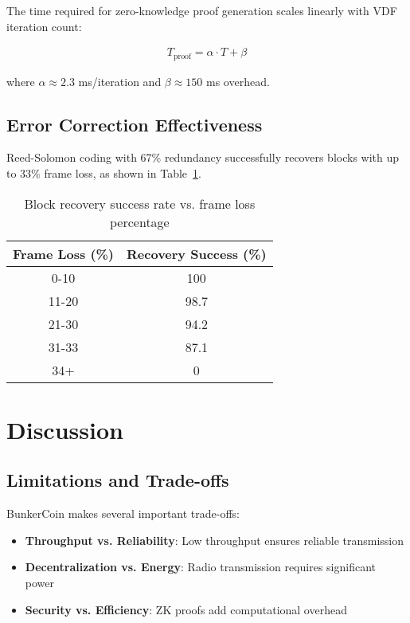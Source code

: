 \documentclass[11pt,a4paper]{article}
\begin{document}
The time required for zero-knowledge proof generation scales linearly with VDF iteration count:

\begin{align}
T_{\text{proof}} = \alpha \cdot T + \beta
\end{align}

where $\alpha \approx 2.3$ ms/iteration and $\beta \approx 150$ ms overhead.

\subsection{Error Correction Effectiveness}

Reed-Solomon coding with 67\% redundancy successfully recovers blocks with up to 33\% frame loss, as shown in Table~\ref{tab:error_correction}.

\begin{table}[h]
\centering
\caption{Block recovery success rate vs. frame loss percentage}
\label{tab:error_correction}
\begin{tabular}{@{}cc@{}}
\toprule
Frame Loss (\%) & Recovery Success (\%) \\
\midrule
0-10 & 100 \\
11-20 & 98.7 \\
21-30 & 94.2 \\
31-33 & 87.1 \\
34+ & 0 \\
\bottomrule
\end{tabular}
\end{table}

\section{Discussion}

\subsection{Limitations and Trade-offs}

BunkerCoin makes several important trade-offs:

\begin{itemize}
\item \textbf{Throughput vs. Reliability}: Low throughput ensures reliable transmission
\item \textbf{Decentralization vs. Energy}: Radio transmission requires significant power
\item \textbf{Security vs. Efficiency}: ZK proofs add computational overhead
\end{itemize}
\end{document}
